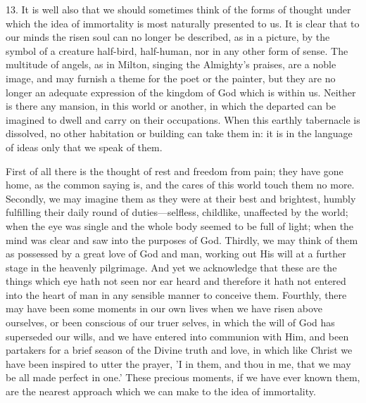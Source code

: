 13. It is well also that we should sometimes think of the forms of thought
under which the idea of immortality is most naturally presented to us. It
is clear that to our minds the risen soul can no longer be described, as
in a picture, by the symbol of a creature half-bird, half-human, nor in
any other form of sense. The multitude of angels, as in Milton, singing
the Almighty's praises, are a noble image, and may furnish a theme for the
poet or the painter, but they are no longer an adequate expression of the
kingdom of God which is within us. Neither is there any mansion, in this
world or another, in which the departed can be imagined to dwell and carry
on their occupations. When this earthly tabernacle is dissolved, no other
habitation or building can take them in: it is in the language of ideas
only that we speak of them.

First of all there is the thought of rest and freedom from pain; they have
gone home, as the common saying is, and the cares of this world touch them
no more. Secondly, we may imagine them as they were at their best and
brightest, humbly fulfilling their daily round of duties—selfless,
childlike, unaffected by the world; when the eye was single and the whole
body seemed to be full of light; when the mind was clear and saw into the
purposes of God. Thirdly, we may think of them as possessed by a great
love of God and man, working out His will at a further stage in the
heavenly pilgrimage. And yet we acknowledge that these are the things
which eye hath not seen nor ear heard and therefore it hath not entered
into the heart of man in any sensible manner to conceive them. Fourthly,
there may have been some moments in our own lives when we have risen above
ourselves, or been conscious of our truer selves, in which the will of God
has superseded our wills, and we have entered into communion with Him, and
been partakers for a brief season of the Divine truth and love, in which
like Christ we have been inspired to utter the prayer, 'I in them, and
thou in me, that we may be all made perfect in one.' These precious
moments, if we have ever known them, are the nearest approach which we can
make to the idea of immortality.

